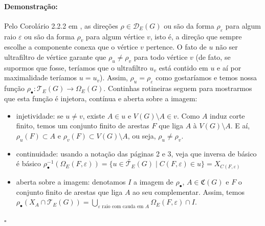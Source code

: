 \documentclass[11pt]{article}
\newcommand{\pulinho}{\vspace{.5cm}}
\theoremstyle{definition}
\theoremstyle{definition}
\theoremstyle{definition}
\theoremstyle{definition}
\theoremstyle{definition}
\theoremstyle{definition}
\theoremstyle{definition}
\theoremstyle{definition}
\theoremstyle{definition}
\theoremstyle{definition}
\theoremstyle{definition}
\theoremstyle{definition}
\newenvironment{prova}{\paragraph{Demonstração:}}{\hfill$\square$ 
\pulinho
}
\begin{document}
\begin{prova}
    Pelo Corolário 2.2.2 em \cite{meninos2025}, as direções $\rho \in \mathcal{D}_E(G)$ ou são da forma $\rho_\varepsilon$ para algum raio $\varepsilon$ ou são da forma $\rho_v$ para algum vértice $v$, isto é, a direção que sempre escolhe a componente conexa que o vértice $v$ pertence. O fato de $u$ não ser ultrafiltro de vértice garante que $\rho_u \neq \rho_v$ para todo vértice $v$ (de fato, se supormos que fosse, teríamos que o ultrafiltro $u_v$ está contido em $u$ e aí por maximalidade teríamos $u = u_v$). Assim, $\rho_u = \rho_\varepsilon$ como gostaríamos e temos nossa função $\rho_{\bullet}:\mathcal{T}_E(G) \rightarrow{} \Omega_E(G)$. Continhas rotineiras seguem para mostrarmos que esta função é injetora, contínua e aberta sobre a imagem:
    \begin{itemize}[]
    \item injetividade: se $u \neq v$, existe $A \in u$ e $V(G) \setminus A \in v$. Como $A$ induz corte finito, temos um conjunto finito de arestas $F$ que liga $A$ à $V(G) \setminus A$. E aí, $\rho_u(F) \subset A$ e $\rho_v(F) \subset V(G) \setminus A$, ou seja, $\rho_u \ne \rho_v$.
    \item continuidade: usando a notação das páginas 2 e 3, veja que inversa de básico é básico $\rho_{\bullet}^{-1}(\Omega_E(F,\varepsilon)) = \{u \in \widetilde{\mathcal{T}_E}(G) \mid C(F,\varepsilon) \in u\} = X_{C(F,\varepsilon)}$
    \item aberta sobre a imagem: denotamos $I$ a imagem de $\rho_\bullet$, $A \in \mathfrak{C}(G)$ e $F$ o conjunto finito de arestas que liga $A$ ao seu complementar. Assim, temos $\rho_\bullet(X_A \cap \mathcal{T}_E(G)) = \underset{\varepsilon \text{ raio com cauda em }A}{\bigcup} \Omega_E(F,\varepsilon) \cap I$.
    
        \end{itemize}


\end{prova}
\end{document}
